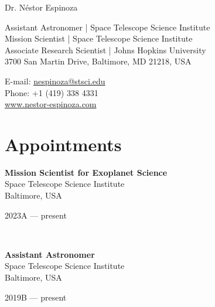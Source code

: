 \documentclass[12pt, a4paper]{article} %
\begin{document}

{\LARGE Dr. N\'estor Espinoza}\\[0.2cm] %
\begin{minipage}[t]{0.63\textwidth}
Assistant Astronomer | Space Telescope Science Institute\\
Mission Scientist | Space Telescope Science Institute\\
Associate Research Scientist | Johns Hopkins University\\
3700 San Martin Drive, Baltimore, MD 21218, USA \\
\end{minipage}
\begin{minipage}[t]{0.37\textwidth}
E-mail: \href{mailto:nespinoza@stsci.edu}{nespinoza@stsci.edu}\\
Phone: +1 (419) 338 4331\\ 
\url{www.nestor-espinoza.com}
\end{minipage}

\hrulefill

\section*{Appointments}


\begin{minipage}[t]{0.6\textwidth}
\begin{flushleft}%
  \setlength{\leftskip}{0.2cm}%
\textbf{Mission Scientist for Exoplanet Science}\\
Space Telescope Science Institute\\
Baltimore, USA
 
\end{flushleft}
\end{minipage}
\begin{minipage}[t]{0.4\textwidth}
\hfill 2023A --- present 
\end{minipage}\\

\begin{minipage}[t]{0.6\textwidth}
\begin{flushleft}%
  \setlength{\leftskip}{0.2cm}%
\textbf{Assistant Astronomer}\\
Space Telescope Science Institute\\
Baltimore, USA
 
\end{flushleft}
\end{minipage}
\begin{minipage}[t]{0.4\textwidth}
\hfill 2019B --- present 
\end{minipage}\\
\end{document}
